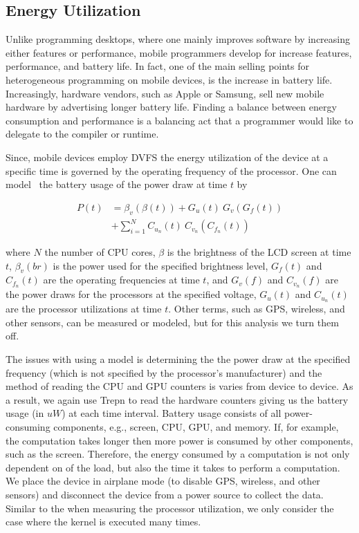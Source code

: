 \subsection{Energy Utilization}


Unlike programming desktops, where one mainly 
  improves software by increasing either features or performance,
  mobile programmers develop for increase features, performance, and 
  battery life.
In fact, one of the main selling points for heterogeneous
  programming on mobile devices, is the increase in battery life.
Increasingly, hardware vendors, such as Apple or Samsung, sell new
  mobile hardware by advertising longer battery life.
Finding a balance between energy consumption and performance is a 
  balancing act that a programmer would like to delegate to the 
  compiler or runtime.


Since, mobile devices employ DVFS
  the energy utilization of the device at a specific time is governed by
  the operating frequency of the processor.
One can model~\cite{zhang2010accurate, dong2011self} the battery usage of the power draw at time $t$ by

\begin{align*}
P(t) &= \beta_v(\beta(t)) + G_u(t) ~ G_v(G_f(t)) \\
     &+ \sum_{i=1}^{N} C_{u_n}(t) ~ C_{v_n}(C_{f_n}(t))
\end{align*}

where $N$ the number of CPU cores, $\beta$ is the brightness of the LCD screen at time $t$, $\beta_v(br)$ is the power used for the specified brightness level, $G_f(t)$ and $C_{f_n}(t)$ are the operating frequencies at time $t$, and $G_v(f)$ and $ C_{v_n}(f)$ are the power draws for the processors at the specified voltage, $G_u(t)$ and $C_{u_n}(t)$ are the processor utilizations at time $t$.
Other terms, such as GPS, wireless, and other sensors, can be measured or modeled, but for this analysis we turn them off.

The issues with using a model is determining the the power draw at the specified
  frequency (which is not specified by the processor's manufacturer) and the method of reading
  the CPU and GPU counters is varies from device to device.
As a result, we again use Trepn to read the hardware counters giving us the battery usage (in $uW$) at each time interval.
Battery usage consists of all power-consuming components, e.g., screen, CPU, GPU, and memory.
If, for example, the computation takes longer then more power is consumed by other components, such as the screen.
Therefore, the energy consumed by a computation is not only dependent on of the load, but also the time it takes to perform a computation.
We place the device in airplane mode (to disable GPS, wireless, and other sensors) and disconnect the device from a power source to 
  collect the data.
Similar to the when measuring the processor utilization, we only consider the case where the kernel is executed many times.

